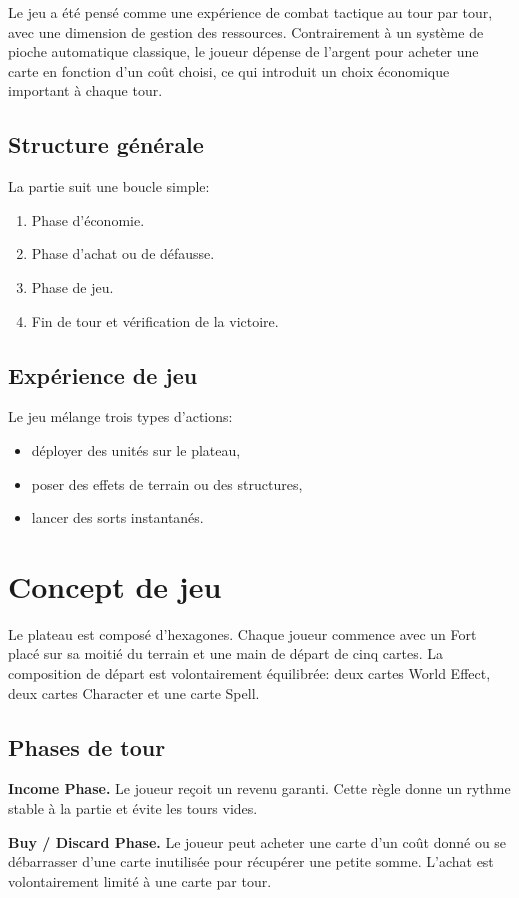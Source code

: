 \documentclass[12pt,a4paper]{article}
\begin{document}
Le jeu a été pensé comme une expérience de combat tactique au tour par tour, avec une dimension de gestion des ressources. Contrairement à un système de pioche automatique classique, le joueur dépense de l'argent pour acheter une carte en fonction d'un coût choisi, ce qui introduit un choix économique important à chaque tour.

\subsection{Structure générale}
La partie suit une boucle simple:
\begin{enumerate}[leftmargin=1.2cm]
    \item Phase d'économie.
    \item Phase d'achat ou de défausse.
    \item Phase de jeu.
    \item Fin de tour et vérification de la victoire.
\end{enumerate}

\subsection{Expérience de jeu}
Le jeu mélange trois types d'actions:
\begin{itemize}[leftmargin=1.2cm]
    \item déployer des unités sur le plateau,
    \item poser des effets de terrain ou des structures,
    \item lancer des sorts instantanés.
\end{itemize}

\section{Concept de jeu}
Le plateau est composé d'hexagones. Chaque joueur commence avec un Fort placé sur sa moitié du terrain et une main de départ de cinq cartes. La composition de départ est volontairement équilibrée: deux cartes World Effect, deux cartes Character et une carte Spell.

\subsection{Phases de tour}
\textbf{Income Phase.} Le joueur reçoit un revenu garanti. Cette règle donne un rythme stable à la partie et évite les tours vides.

\textbf{Buy / Discard Phase.} Le joueur peut acheter une carte d'un coût donné ou se débarrasser d'une carte inutilisée pour récupérer une petite somme. L'achat est volontairement limité à une carte par tour.
\end{document}
